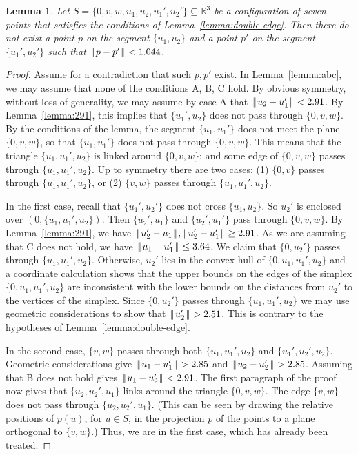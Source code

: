 \documentclass[11pt]{amsart}
\newcommand{\ring}[1]{\mathbb{#1}}
\def\|{{\hskip0.1em|\hskip-0.15em|\hskip0.1em}}
\let\subset=\subseteq
\newtheorem{lemma}{Lemma}
\begin{document}
\begin{lemma}\label{lemma:7big}  
Let $S=\{0,v,w,u_1,u_2,u_1',u_2'\}\subset\ring{R}^3$
be a configuration of seven points that satisfies
the conditions of Lemma~\ref{lemma:double-edge}.  Then there do not exist
a point $p$ on the segment $\{u_1,u_2\}$ and  a point $p'$ on the segment
$\{u_1',u_2'\}$ such that $\|p-p'\|<1.044$.
\end{lemma}

\begin{proof}  Assume for a contradiction that such $p,p'$ exist.
In Lemma~\ref{lemma:abc}, we may assume that none of the
conditions A, B, C hold.  By obvious symmetry, without loss of generality, we may assume by case A
that $\|u_2-u_1'\|<2.91$.  By Lemma~\ref{lemma:291}, this implies that $\{u_1',u_2\}$ does not pass through $\{0,v,w\}$.  By the conditions of the lemma, the segment $\{u_1,u_1'\}$ does not meet the plane $\{0,v,w\}$, so that $\{u_1,u_1'\}$ does not pass through $\{0,v,w\}$.  This means that the triangle $\{u_1,u_1',u_2\}$ is linked around $\{0,v,w\}$; and  some edge of $\{0,v,w\}$ passes through $\{u_1,u_1',u_2\}$.  Up to symmetry there are two cases: (1) $\{0,v\}$ passes through $\{u_1,u_1',u_2\}$, or (2) $\{v,w\}$ passes through $\{u_1,u_1',u_2\}$.

In the first case, recall that $\{u_1',u_2'\}$ does not cross $\{u_1,u_2\}$.
So $u_2'$ is enclosed over $(0,\{u_1,u_1',u_2\})$.  Then $\{u_2',u_1\}$
and $\{u_2',u_1'\}$ pass through $\{0,v,w\}$.  By Lemma~\ref{lemma:291}, we
have $\|u_2'-u_1\|,\|u_2'-u_1'\|\ge 2.91$.  As we are assuming that C does not hold, we have $\|u_1-u_1'\|\le 3.64$.  We claim that $\{0,u_2'\}$
passes through $\{u_1,u_1',u_2\}$.  Otherwise, $u_2'$ lies in the convex hull of $\{0,u_1,u_1',u_2\}$ and a coordinate calculation shows that the upper bounds on the edges of the simplex $\{0,u_1,u_1',u_2\}$ are inconsistent with the lower bounds on the distances from $u_2'$ to the vertices of the simplex.  Since $\{0,u_2'\}$ passes through $\{u_1,u_1',u_2\}$ we may use geometric considerations to show that $\|u_2'\| > 2.51$.  This is contrary to the hypotheses of Lemma~\ref{lemma:double-edge}.

In the second case, $\{v,w\}$ passes through both $\{u_1,u_1',u_2\}$ and $\{u_1',u_2',u_2\}$.  Geometric considerations give $\|u_1-u_1'\|>2.85$ and $\|u_2-u_2'\|> 2.85$.  Assuming that B does not hold gives $\|u_1-u_2'\|< 2.91$.  The first paragraph of the proof now gives that $\{u_2,u_2',u_1\}$ links around the triangle $\{0,v,w\}$.  The edge $\{v,w\}$ does not pass through $\{u_2,u_2',u_1\}$.  (This can be seen by drawing the relative positions of $p(u)$, for $u\in S$, in the projection $p$ of the points to a plane orthogonal to $\{v,w\}$.)  Thus, we are in the first case, which has already been treated.
\end{proof}
\end{document}
